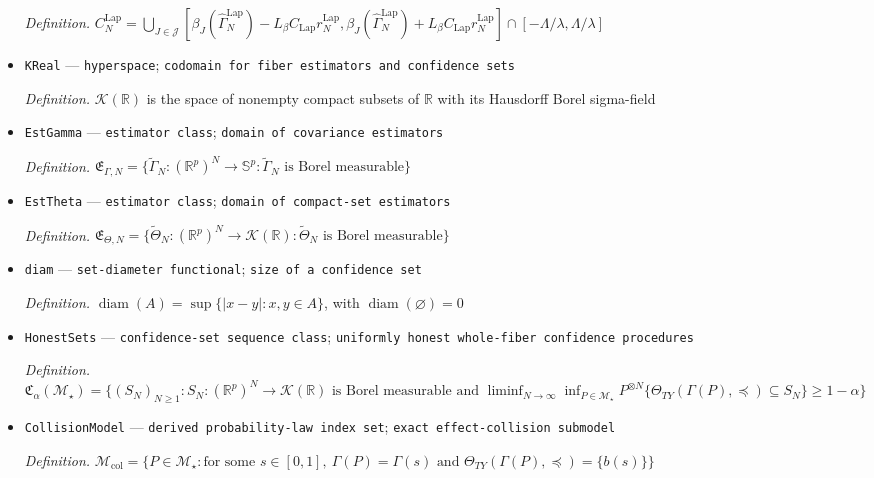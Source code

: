 \documentclass{article}
\begin{document}
\begin{itemize}
  \par\smallskip\noindent\emph{Definition.} \(C_N^{\mathrm{Lap}}=\bigcup_{J\in\mathcal J}[\beta_J(\widehat\Gamma_N^{\mathrm{Lap}})-L_\beta C_{\mathrm{Lap}}r_N^{\mathrm{Lap}},\beta_J(\widehat\Gamma_N^{\mathrm{Lap}})+L_\beta C_{\mathrm{Lap}}r_N^{\mathrm{Lap}}]\cap[-\Lambda/\lambda,\Lambda/\lambda]\)
  \item \texttt{KReal} --- \texttt{hyperspace}; \texttt{codomain for fiber estimators and confidence sets}
  \par\smallskip\noindent\emph{Definition.} \(\mathcal K(\mathbb R)\) is the space of nonempty compact subsets of \(\mathbb R\) with its Hausdorff Borel sigma-field
  \item \texttt{EstGamma} --- \texttt{estimator class}; \texttt{domain of covariance estimators}
  \par\smallskip\noindent\emph{Definition.} \(\mathfrak E_{\Gamma,N}=\{\widetilde\Gamma_N:(\mathbb R^p)^N\to\mathbb S^p:\widetilde\Gamma_N\text{ is Borel measurable}\}\)
  \item \texttt{EstTheta} --- \texttt{estimator class}; \texttt{domain of compact-\allowbreak{}set estimators}
  \par\smallskip\noindent\emph{Definition.} \(\mathfrak E_{\Theta,N}=\{\widetilde\Theta_N:(\mathbb R^p)^N\to\mathcal K(\mathbb R):\widetilde\Theta_N\text{ is Borel measurable}\}\)
  \item \texttt{diam} --- \texttt{set-\allowbreak{}diameter functional}; \texttt{size of a confidence set}
  \par\smallskip\noindent\emph{Definition.} \(\operatorname{diam}(A)=\sup\{|x-y|:x,y\in A\}\), with \(\operatorname{diam}(\varnothing)=0\)
  \item \texttt{HonestSets} --- \texttt{confidence-\allowbreak{}set sequence class}; \texttt{uniformly honest whole-\allowbreak{}fiber confidence procedures}
  \par\smallskip\noindent\emph{Definition.} \(\mathfrak C_\alpha(\mathcal M_\star)=\{(S_N)_{N\ge1}:S_N:(\mathbb R^p)^N\to\mathcal K(\mathbb R)\text{ is Borel measurable and }\liminf_{N\to\infty}\inf_{P\in\mathcal M_\star}P^{\otimes N}\{\Theta_{TY}(\Gamma(P),\preceq)\subseteq S_N\}\ge1-\alpha\}\)
  \item \texttt{CollisionModel} --- \texttt{derived probability-\allowbreak{}law index set}; \texttt{exact effect-\allowbreak{}collision submodel}
  \par\smallskip\noindent\emph{Definition.} \(\mathcal M_{\mathrm{col}}=\{P\in\mathcal M_\star:\text{for some }s\in[0,1],\ \Gamma(P)=\Gamma(s)\text{ and }\Theta_{TY}(\Gamma(P),\preceq)=\{b(s)\}\}\)

\end{itemize}
\end{document}
